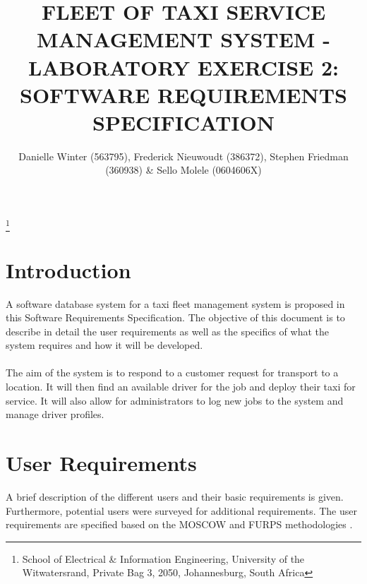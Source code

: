 \documentclass[10pt,twocolumn]{witseiepaper}
\begin{document}
\title{FLEET OF TAXI SERVICE MANAGEMENT SYSTEM - LABORATORY EXERCISE 2: SOFTWARE REQUIREMENTS SPECIFICATION}

\author{Danielle Winter (563795), Frederick Nieuwoudt (386372), Stephen Friedman (360938) \& Sello Molele (0604606X)}
\thanks{School of Electrical \& Information Engineering, University of the
Witwatersrand, Private Bag 3, 2050, Johannesburg, South Africa}


%

\maketitle
\thispagestyle{empty}\pagestyle{empty}


%
\section{Introduction}
A software database system for a taxi fleet management system is proposed in this Software Requirements Specification. The objective of this document is to describe in detail the user requirements as well as the specifics of what the system requires and how it will be developed.\\\\
The aim of the system is to respond to a customer request for transport to a location. It will then find an available driver for the job and deploy their taxi for service. It will also allow for administrators to log new jobs to the system and manage driver profiles.

\section{User Requirements}
A brief description of the different users and their basic requirements is given. Furthermore, potential users were surveyed for additional requirements. The user requirements are specified based on the MOSCOW and FURPS methodologies \cite{SoftwareEngTextbook}.
\end{document}
